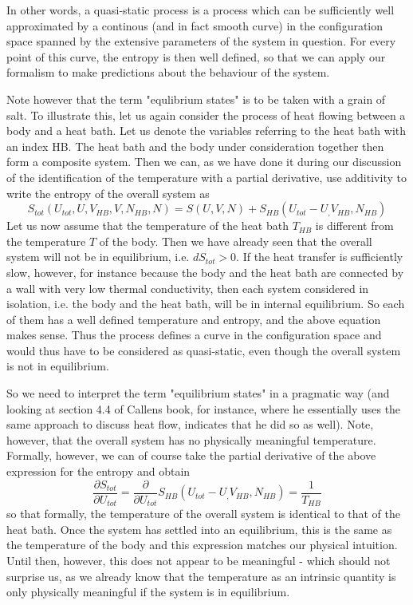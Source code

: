 \documentclass[a4paper, draft]{article}
\theoremstyle{own}
\theoremstyle{remark}
\begin{document}
In other words, a quasi-static process is a process which can be sufficiently well approximated by a continous (and in fact smooth curve) in the configuration space spanned by the extensive parameters of the system in question. For every point of this curve, the entropy is then well defined, so that we can apply our formalism to make predictions about the behaviour of the system.

Note however that the term "equlibrium states" is to be taken with a grain of salt. To illustrate this, let us again consider the process of heat flowing between a body and a heat bath. Let us denote the variables referring to the heat bath with an index HB. The heat bath and the body under consideration together then form a composite system. Then we can, as we have done it during our discussion of the identification of the temperature with a partial derivative, use additivity to write the entropy of the overall system as
$$
S_{tot}(U_{tot}, U, V_{HB}, V, N_{HB}, N) = S(U, V, N) + S_{HB}(U_{tot} - U_, V_{HB}, N_{HB})
$$
Let us now assume that the temperature of the heat bath $T_{HB}$ is different from the temperature $T$ of the body. Then we have already seen that the overall system will not be in equilibrium, i.e. $dS_{tot} > 0$. If the heat transfer is sufficiently slow, however, for instance because the body and the heat bath are connected by a wall with very low thermal conductivity, then each system considered in isolation, i.e. the body and the heat bath, will be in internal equilibrium. So each of them has a well defined temperature and entropy, and the above equation makes sense. Thus the process defines a curve in the configuration space and would thus have to be considered as quasi-static, even though the overall system is not in equilibrium.

So we need to interpret the term "equilibrium states" in a pragmatic way (and looking at section 4.4 of Callens book, for instance, where he essentially uses the same approach to discuss heat flow, indicates that he did so as well). Note, however, that the overall system has no physically meaningful temperature. Formally, however, we can of course take the partial derivative of the above expression for the entropy and obtain
$$
\frac{\partial S_{tot}}{\partial U_{tot}} = \frac{\partial}{\partial U_{tot}} S_{HB}(U_{tot} - U_, V_{HB}, N_{HB}) = \frac{1}{T_{HB}}
$$
so that formally, the temperature of the overall system is identical to that of the heat bath. Once the system has settled into an equilibrium, this is the same as the temperature of the body and this expression matches our physical intuition. Until then, however, this does not appear to be meaningful - which should not surprise us, as we already know that the temperature as an intrinsic quantity is only physically meaningful if the system is in equilibrium.
\end{document}
